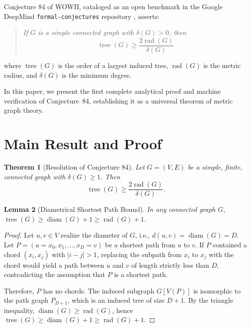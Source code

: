 \documentclass[11pt,a4paper]{article}
\theoremstyle{plain}
\newtheorem{theorem}{Theorem}
\newtheorem{lemma}[theorem]{Lemma}
\theoremstyle{definition}
\begin{document}
Conjecture 84 of WOWII, cataloged as an open benchmark in the Google DeepMind \texttt{formal-conjectures} repository \cite{formalconjectures2025}, asserts:
\begin{quote}
\textit{If $G$ is a simple connected graph with $\delta(G) > 0$, then}
\[
\operatorname{tree}(G) \ge \frac{2 \operatorname{rad}(G)}{\delta(G)}
\]
\end{quote}
where $\operatorname{tree}(G)$ is the order of a largest induced tree, $\operatorname{rad}(G)$ is the metric radius, and $\delta(G)$ is the minimum degree. 

In this paper, we present the first complete analytical proof and machine verification of Conjecture~84, establishing it as a universal theorem of metric graph theory.

\section{Main Result and Proof}

\begin{theorem}[Resolution of Conjecture 84]
Let $G = (V, E)$ be a simple, finite, connected graph with $\delta(G) \ge 1$. Then
\begin{equation}
\operatorname{tree}(G) \ge \frac{2 \operatorname{rad}(G)}{\delta(G)}.
\end{equation}
\end{theorem}

\begin{lemma}[Diametrical Shortest Path Bound]
\label{lem:diam}
In any connected graph $G$, $\operatorname{tree}(G) \ge \operatorname{diam}(G) + 1 \ge \operatorname{rad}(G) + 1$.
\end{lemma}

\begin{proof}
Let $u, v \in V$ realize the diameter of $G$, i.e., $d(u, v) = \operatorname{diam}(G) = D$. Let $P = (u = x_0, x_1, \dots, x_D = v)$ be a shortest path from $u$ to $v$. If $P$ contained a chord $(x_i, x_j)$ with $|i - j| > 1$, replacing the subpath from $x_i$ to $x_j$ with the chord would yield a path between $u$ and $v$ of length strictly less than $D$, contradicting the assumption that $P$ is a shortest path. 

Therefore, $P$ has no chords. The induced subgraph $G[V(P)]$ is isomorphic to the path graph $P_{D+1}$, which is an induced tree of size $D + 1$. By the triangle inequality, $\operatorname{diam}(G) \ge \operatorname{rad}(G)$, hence $\operatorname{tree}(G) \ge \operatorname{diam}(G) + 1 \ge \operatorname{rad}(G) + 1$.
\end{proof}
\end{document}

